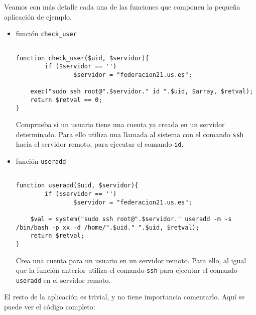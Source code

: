     Veamos con más detalle cada una de las funciones que componen la
    pequeña aplicación de ejemplo.

    \begin{itemize}

    \item función \texttt{check\_user}

    \begin{lstlisting}

function check_user($uid, $servidor){
        if ($servidor == '')
                $servidor = "federacion21.us.es";

	exec("sudo ssh root@".$servidor." id ".$uid, $array, $retval);
	return $retval == 0;
}

    \end{lstlisting}

    Comprueba si un usuario tiene una cuenta ya creada en un servidor
    determinado. Para ello utiliza una llamada al sistema con el
    comando \texttt{ssh} hacia el servidor remoto, para ejecutar el comando
    \texttt{id}.

    \item función \texttt{useradd}

    \begin{lstlisting}

function useradd($uid, $servidor){
        if ($servidor == '')
                $servidor = "federacion21.us.es";

	$val = system("sudo ssh root@".$servidor." useradd -m -s /bin/bash -p xx -d /home/".$uid." ".$uid, $retval);
	return $retval;
}

    \end{lstlisting}

    Crea una cuenta para un usuario en un servidor remoto. Para ello,
    al igual que la función anterior utiliza el comando \texttt{ssh}
    para ejecutar el comando \texttt{useradd} en el servidor remoto.

    \end{itemize}
    
    El resto de la aplicación es trivial, y no tiene importancia
    comentarlo. Aquí se puede ver el código completo:

